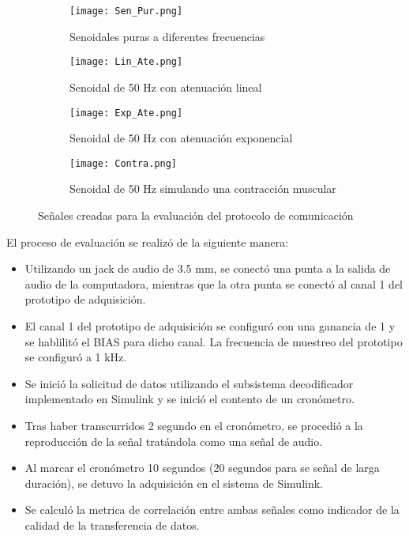 \begin{figure}[htbp]
	\centering
	\begin{subfigure}[htbp]{0.4\textwidth}
		\texttt{[image: Sen\_Pur.png]}
		\caption{Senoidales puras a diferentes frecuencias}
		\label{Figura: SenPur}
	\end{subfigure}
	\hfill
	\begin{subfigure}[htbp]{0.4\textwidth}
		\texttt{[image: Lin\_Ate.png]}
		\caption{Senoidal de 50 Hz con atenuación lineal}
		\label{Figura: LinAte}
	\end{subfigure}
	\hfill
	\begin{subfigure}[htbp]{0.4\textwidth}
		\texttt{[image: Exp\_Ate.png]}
		\caption{Senoidal de 50 Hz con atenuación exponencial}
		\label{Figura: ExpAte}
	\end{subfigure}
	\hfill
	\begin{subfigure}[htbp]{0.4\textwidth}
		\texttt{[image: Contra.png]}
		\caption{Senoidal de 50 Hz simulando una contracción muscular}
		\label{Figura: Contra}
	\end{subfigure}	
	\caption{Señales creadas para la evaluación del protocolo de comunicación}
	\label{Figura: SenalesEva}
\end{figure}

El proceso de evaluación se realizó de la siguiente manera:
\begin{itemize}
	\item Utilizando un jack de audio de 3.5 mm, se conectó una punta a la salida de audio de la computadora, mientras que la otra punta se conectó al canal 1 del prototipo de adquisición.
	\item El canal 1 del prototipo de adquisición se configuró con una ganancia de 1 y se hablilitó el BIAS para dicho canal. La frecuencia de muestreo del prototipo se configuró a 1 kHz.
	\item Se inició la solicitud de datos utilizando el subsistema decodificador implementado en Simulink y se inició el contento de un cronómetro.
	\item Tras haber transcurridos 2 segundo en el cronómetro, se procedió a la reproducción de la señal tratándola como una señal de audio.
	\item Al marcar el cronómetro 10 segundos (20 segundos para se señal de larga duración), se detuvo la adquisición en el sistema de Simulink.
	\item Se calculó la metrica de correlación entre ambas señales como indicador de la calidad de la transferencia de datos.
\end{itemize}

